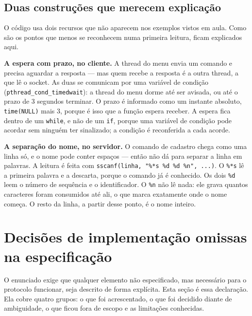 \documentclass[12pt,a4paper]{article}
\begin{document}
\subsection{Duas construções que merecem explicação}

O código usa dois recursos que não aparecem nos exemplos vistos em aula. Como são
os pontos que menos se reconhecem numa primeira leitura, ficam explicados aqui.

\vspace{6pt}
\noindent\textbf{A espera com prazo, no cliente.} A thread do menu envia um
comando e precisa aguardar a resposta --- mas quem recebe a resposta é a outra
thread, a que lê o socket. As duas se comunicam por uma variável de condição
(\texttt{pthread\_cond\_timedwait}): a thread do menu dorme até ser avisada, ou
até o prazo de 3 segundos terminar. O prazo é informado como um instante
absoluto, \texttt{time(NULL)} mais 3, porque é isso que a função espera receber.
A espera fica dentro de um \texttt{while}, e não de um \texttt{if}, porque uma
variável de condição pode acordar sem ninguém ter sinalizado; a condição é
reconferida a cada acorde.

\vspace{6pt}
\noindent\textbf{A separação do nome, no servidor.} O comando de cadastro chega
como uma linha só, e o nome pode conter espaços --- então não dá para separar a
linha em palavras. A leitura é feita com
\texttt{sscanf(linha, "\%*s \%d \%d \%n", ...)}. O \texttt{\%*s} lê a primeira
palavra e a descarta, porque o comando já é conhecido. Os dois \texttt{\%d} leem
o número de sequência e o identificador. O \texttt{\%n} não lê nada: ele grava
quantos caracteres foram consumidos até ali, o que marca exatamente onde o nome
começa. O resto da linha, a partir desse ponto, é o nome inteiro.

\section{Decisões de implementação omissas na especificação}
\label{sec:omissos}

O enunciado exige que qualquer elemento não especificado, mas necessário para o
protocolo funcionar, seja descrito de forma explícita. Esta seção é essa
declaração. Ela cobre quatro grupos: o que foi acrescentado, o que foi decidido
diante de ambiguidade, o que ficou fora de escopo e as limitações conhecidas.
\end{document}
